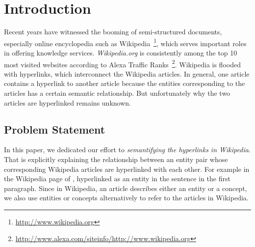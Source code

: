 \section{Introduction}
Recent years have witnessed the booming of semi-structured documents, especially online encyclopedia such as  Wikipedia~\footnote{\small\url{http://www.wikipedia.org}}, which serves important roles in offering knowledge services.
{\it Wikipedia.org} is consistently among the top 10 most visited websites according to Alexa Traffic Ranks~\footnote{\small\url{http://www.alexa.com/siteinfo/http://www.wikipedia.org}}.
Wikipedia is flooded with hyperlinks, which interconnect the Wikipedia articles.
In general, one article contains a hyperlink to another article because the entities corresponding to the articles has a certain semantic relationship.
But unfortunately why the two articles are hyperlinked remains unknown.

\subsection{Problem Statement}
In this paper, we dedicated our effort to {\it semantifying the hyperlinks in Wikipedia}.
That is explicitly explaining the relationship between an entity pair whose corresponding Wikipedia articles are hyperlinked with each other.
For example in the Wikipedia page of ,  hyperlinked as an entity in the sentence  in the first paragraph.
Since in Wikipedia, an article describes either an entity or a concept, we also use entities or concepts alternatively to refer to the articles in Wikipedia.


